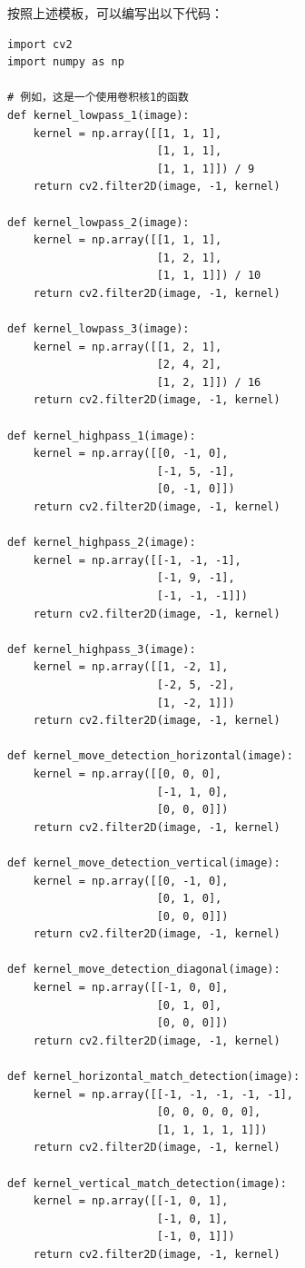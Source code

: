 \documentclass[a4paper,12pt]{article}
\begin{document}
按照上述模板，可以编写出以下代码：
\begin{lstlisting}[style=python]
import cv2
import numpy as np

# 例如，这是一个使用卷积核1的函数
def kernel_lowpass_1(image):
    kernel = np.array([[1, 1, 1],
                       [1, 1, 1],
                       [1, 1, 1]]) / 9
    return cv2.filter2D(image, -1, kernel)

def kernel_lowpass_2(image):
    kernel = np.array([[1, 1, 1],
                       [1, 2, 1],
                       [1, 1, 1]]) / 10
    return cv2.filter2D(image, -1, kernel)

def kernel_lowpass_3(image):
    kernel = np.array([[1, 2, 1],
                       [2, 4, 2],
                       [1, 2, 1]]) / 16
    return cv2.filter2D(image, -1, kernel)

def kernel_highpass_1(image):
    kernel = np.array([[0, -1, 0],
                       [-1, 5, -1],
                       [0, -1, 0]])
    return cv2.filter2D(image, -1, kernel)

def kernel_highpass_2(image):
    kernel = np.array([[-1, -1, -1],
                       [-1, 9, -1],
                       [-1, -1, -1]])
    return cv2.filter2D(image, -1, kernel)

def kernel_highpass_3(image):
    kernel = np.array([[1, -2, 1],
                       [-2, 5, -2],
                       [1, -2, 1]])
    return cv2.filter2D(image, -1, kernel)

def kernel_move_detection_horizontal(image):
    kernel = np.array([[0, 0, 0],
                       [-1, 1, 0],
                       [0, 0, 0]])
    return cv2.filter2D(image, -1, kernel)

def kernel_move_detection_vertical(image):
    kernel = np.array([[0, -1, 0],
                       [0, 1, 0],
                       [0, 0, 0]])
    return cv2.filter2D(image, -1, kernel)

def kernel_move_detection_diagonal(image):
    kernel = np.array([[-1, 0, 0],
                       [0, 1, 0],
                       [0, 0, 0]])
    return cv2.filter2D(image, -1, kernel)

def kernel_horizontal_match_detection(image):
    kernel = np.array([[-1, -1, -1, -1, -1],
                       [0, 0, 0, 0, 0],
                       [1, 1, 1, 1, 1]])
    return cv2.filter2D(image, -1, kernel)

def kernel_vertical_match_detection(image):
    kernel = np.array([[-1, 0, 1],
                       [-1, 0, 1],
                       [-1, 0, 1]])
    return cv2.filter2D(image, -1, kernel)


\end{lstlisting}
\end{document}
